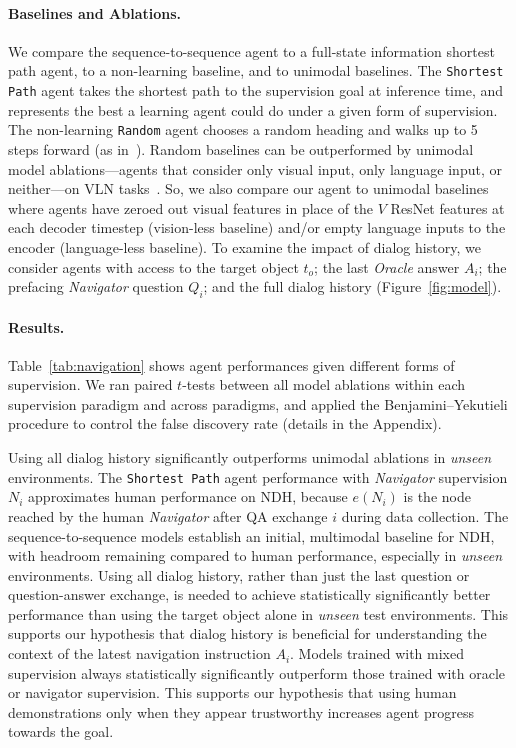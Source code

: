 \documentclass{article}
\newcommand{\task}{NDH}
\newcommand{\nav}{\textit{Navigator}}
\newcommand{\ora}{\textit{Oracle}}
\begin{document}
\paragraph{Baselines and Ablations.}
We compare the sequence-to-sequence agent to a full-state information shortest path agent, to a non-learning baseline, and to unimodal baselines.
The \texttt{Shortest Path} agent takes the shortest path to the supervision goal at inference time, and represents the best a learning agent could do under a given form of supervision.
The non-learning \texttt{Random} agent chooses a random heading and walks up to 5 steps forward (as in~\cite{anderson:cvpr18}).
Random baselines can be outperformed by unimodal model ablations---agents that consider only visual input, only language input, or neither---on VLN tasks~\cite{thomason:naacl19}.
So, we also compare our agent to unimodal baselines where agents have zeroed out visual features in place of the $V$ ResNet features at each decoder timestep (vision-less baseline) and/or empty language inputs to the encoder (language-less baseline).
To examine the impact of dialog history, we consider agents with access to the target object $t_o$; the last \ora{} answer $A_i$; the prefacing \nav{} question $Q_i$; and the full dialog history (Figure~\ref{fig:model}).

\paragraph{Results.}
Table~\ref{tab:navigation} shows agent performances given different forms of supervision.
We ran paired $t$-tests between all model ablations within each supervision paradigm and across paradigms, and applied the Benjamini--Yekutieli procedure to control the false discovery rate (details in the Appendix).

Using all dialog history significantly outperforms unimodal ablations in \textit{unseen} environments.
The \texttt{Shortest Path} agent performance with \nav{} supervision $N_i$ approximates human performance on \task{}, because $e(N_i)$ is the node reached by the human \nav{} after QA exchange $i$ during data collection.
The sequence-to-sequence models establish an initial, multimodal baseline for \task{}, with headroom remaining compared to human performance, especially in \textit{unseen} environments.
Using all dialog history, rather than just the last question or question-answer exchange, is needed to achieve statistically significantly better performance than using the target object alone in \textit{unseen} test environments.
This supports our hypothesis that dialog history is beneficial for understanding the context of the latest navigation instruction $A_i$.
Models trained with mixed supervision always statistically significantly outperform those trained with oracle or navigator supervision.
This supports our hypothesis that using human demonstrations only when they appear trustworthy increases agent progress towards the goal.
 
\end{document}
